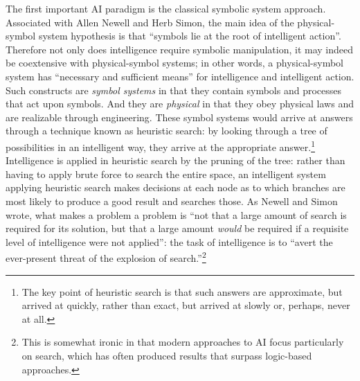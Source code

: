 The first important AI paradigm is the classical symbolic system
approach. Associated with Allen Newell and Herb Simon, the main idea of the
physical-symbol system hypothesis is that ``symbols lie at the root of
intelligent action''\cite[p. 109]{newellsimon}. Therefore not only
does intelligence require symbolic manipulation, it may indeed be
coextensive with physical-symbol systems; in other words, a
physical-symbol system has ``necessary and sufficient means'' for
intelligence and intelligent action.\cite[p. 111]{newellsimon} Such
constructs are \emph{symbol systems} in that they contain symbols and processes
that act upon symbols. And they are \emph{physical} in that they obey
physical laws and are realizable through engineering.
These symbol systems would arrive at answers through a technique known as
heuristic search: by looking through a tree of possibilities in an
intelligent way, they arrive at the appropriate answer.\footnote{The key
  point of heuristic search is that such answers are approximate, but
  arrived at quickly, rather than exact, but arrived at slowly or,
  perhaps, never at all.} Intelligence is applied in heuristic search
by the pruning of the tree: rather than having to apply brute force to
search the entire space, an intelligent system applying heuristic
search makes decisions at each node as to which branches are most
likely to produce a good result and searches those.\cite[p.
  124]{newellsimon} As Newell and Simon wrote, what makes a problem a
problem is ``not that a large amount of search is required for its
solution, but that a large amount \emph{would} be required if a requisite
level of intelligence were not applied'': the task of intelligence is
to ``avert the ever-present threat of the explosion of
search.''\cite[p. 125]{newellsimon}\footnote{This is somewhat ironic in that
  modern approaches to AI focus particularly on search, which has
  often produced results that surpass logic-based approaches.} 

